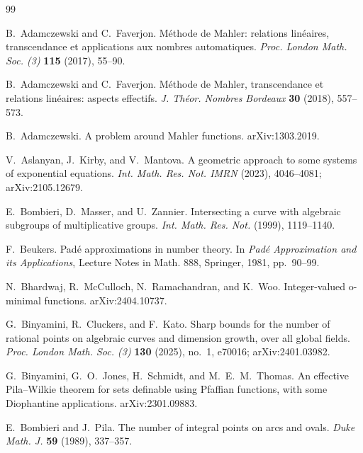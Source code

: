 \documentclass[10pt,letterpaper]{article}
\begin{document}
\begingroup
\small
\sloppy
\begin{thebibliography}{99}

B.~Adamczewski and C.~Faverjon.
\newblock M\'ethode de Mahler: relations lin\'eaires, transcendance et applications aux nombres automatiques.
\newblock \emph{Proc. London Math. Soc. (3)} \textbf{115} (2017), 55--90.

B.~Adamczewski and C.~Faverjon.
\newblock M\'ethode de Mahler, transcendance et relations lin\'eaires: aspects effectifs.
\newblock \emph{J. Th\'eor. Nombres Bordeaux} \textbf{30} (2018), 557--573.

B.~Adamczewski.
\newblock A problem around Mahler functions.
\newblock arXiv:1303.2019.

V.~Aslanyan, J.~Kirby, and V.~Mantova.
\newblock A geometric approach to some systems of exponential equations.
\newblock \emph{Int. Math. Res. Not. IMRN} (2023), 4046--4081; arXiv:2105.12679.

E.~Bombieri, D.~Masser, and U.~Zannier.
\newblock Intersecting a curve with algebraic subgroups of multiplicative groups.
\newblock \emph{Int. Math. Res. Not.} (1999), 1119--1140.

F.~Beukers.
\newblock Pad\'e approximations in number theory.
\newblock In \emph{Pad\'e Approximation and its Applications}, Lecture Notes in Math. 888, Springer, 1981, pp.~90--99.

N.~Bhardwaj, R.~McCulloch, N.~Ramachandran, and K.~Woo.
\newblock Integer-valued o-minimal functions.
\newblock arXiv:2404.10737.

G.~Binyamini, R.~Cluckers, and F.~Kato.
\newblock Sharp bounds for the number of rational points on algebraic curves and dimension growth, over all global fields.
\newblock \emph{Proc. London Math. Soc. (3)} \textbf{130} (2025), no.~1, e70016; arXiv:2401.03982.

G.~Binyamini, G.~O.~Jones, H.~Schmidt, and M.~E.~M.~Thomas.
\newblock An effective Pila--Wilkie theorem for sets definable using Pfaffian functions, with some Diophantine applications.
\newblock arXiv:2301.09883.

E.~Bombieri and J.~Pila.
\newblock The number of integral points on arcs and ovals.
\newblock \emph{Duke Math. J.} \textbf{59} (1989), 337--357.


\end{thebibliography}
\end{document}
